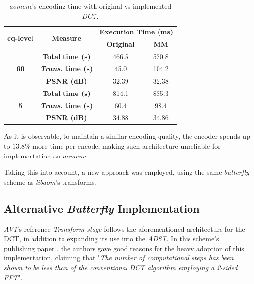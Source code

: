 \begin{table}[!htpb]
    \centering
    \caption{\emph{aomenc}'s encoding time with original vs implemented \emph{DCT}.}
    \begin{tabular}{cccc} \toprule
        \multirow{2}{*}{\textbf{cq-level}} & \multirow{2}{*}{\textbf{Measure}} &    \multicolumn{2}{c}{\textbf{Execution Time (ms)}} \\
        &   &   \textbf{Original} &      \textbf{MM} \\ \toprule
         \multirow{3}{*}{\textbf{60}}   & \textbf{Total time (s)}       & 466.5     & 530.8 \\
                                        & \textbf{\emph{Trans.} time (s)}    & 45.0      & 104.2 \\
                                        & \textbf{PSNR (dB)}            & 32.39     & 32.38 \\ \hline
         \multirow{3}{*}{\textbf{5}}    & \textbf{Total time (s)}       & 814.1     & 835.3 \\
                                        & \textbf{\emph{Trans.} time (s)}    & 60.4      & 98.4 \\
                                        & \textbf{PSNR (dB)}            & 34.88     & 34.86 \\                                        
         \bottomrule
    \end{tabular}    
    \label{tab:multresults}
\end{table}

As it is observable, to maintain a similar encoding quality, the encoder spends up to $13.8\%$ more time per encode, making such architecture unreliable for implementation on \emph{aomenc}.

Taking this into account, a new approach was employed, using the same \emph{butterfly} scheme as \emph{libaom}'s transforms.

\subsection{Alternative \emph{Butterfly} Implementation}

\emph{AV1}'s reference \emph{Transform stage} follows the aforementioned architecture for the DCT, in addition to expanding its use into the \emph{ADST}. In this scheme's publishing paper \cite{wen-hsiungchenFastComputationalAlgorithm1977}, the authors gave good reasons for the heavy adoption of this implementation, claiming that "\emph{The number of computational steps has been shown to be less than  of the conventional DCT algorithm employing a 2-sided FFT}". 

